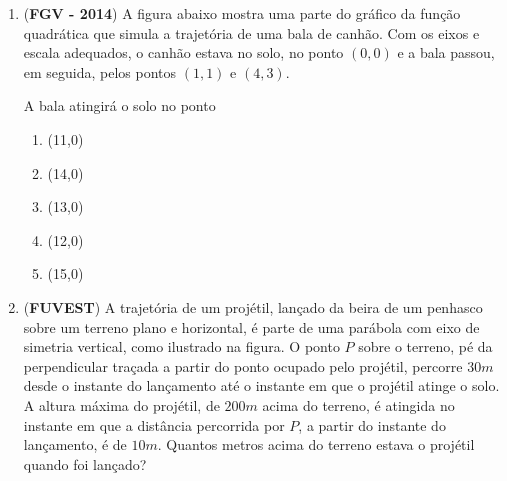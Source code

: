 \begin{enumerate}
\item (\textbf{FGV - 2014}) A figura abaixo mostra uma parte do gráfico da função quadrática que simula a trajetória de uma bala de canhão. Com os eixos e escala adequados, o canhão estava no solo, no ponto \((0,0)\) e a bala passou, em seguida, pelos pontos \((1,1)\) e \((4,3)\).
\begin{center}\end{center}
A bala atingirá o solo no ponto
\begin{enumerate}
\item (11,0)
\item (14,0)
\item (13,0)
\item (12,0)
\item (15,0)
\end{enumerate}

\item (\textbf{FUVEST}) A trajetória de um projétil, lançado da beira de um penhasco sobre um terreno plano e horizontal, é parte de uma parábola com eixo de simetria vertical, como ilustrado na figura. O ponto \(P\) sobre o terreno, pé da perpendicular traçada a partir do ponto ocupado pelo projétil, percorre \(30m\) desde o instante do lançamento até o instante em que o projétil atinge o solo. A altura máxima do projétil, de \(200m\) acima do terreno, é atingida no instante
em que a distância percorrida por \(P\), a partir do instante do lançamento, é de \(10m\). Quantos metros acima do terreno estava o projétil quando foi lançado?

\begin{figure}[H]
\centering
\capstart


\end{figure}
\end{enumerate}
